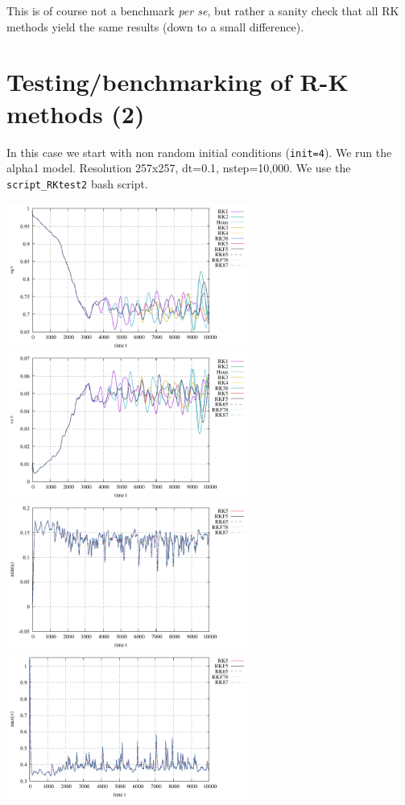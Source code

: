 This is of course not a benchmark {\it per se}, but rather a sanity check that 
all RK methods yield the same results (down to a small difference).


\newpage
\section*{Testing/benchmarking of R-K methods (2)}

In this case we start with non random initial conditions (\lstinline{init=4}).
We run the alpha1 model. Resolution 257x257, dt=0.1, nstep=10,000.
We use the {\tt script\_RKtest2} bash script.

\begin{center}
\includegraphics[width=8cm]{python_codes/fieldstone_171/RKtest2/avrg_u.pdf}
\includegraphics[width=8cm]{python_codes/fieldstone_171/RKtest2/avrg_v.pdf}\\
\includegraphics[width=8cm]{python_codes/fieldstone_171/RKtest2/stats_u.pdf}
\includegraphics[width=8cm]{python_codes/fieldstone_171/RKtest2/stats_v.pdf}\\

\end{center}

